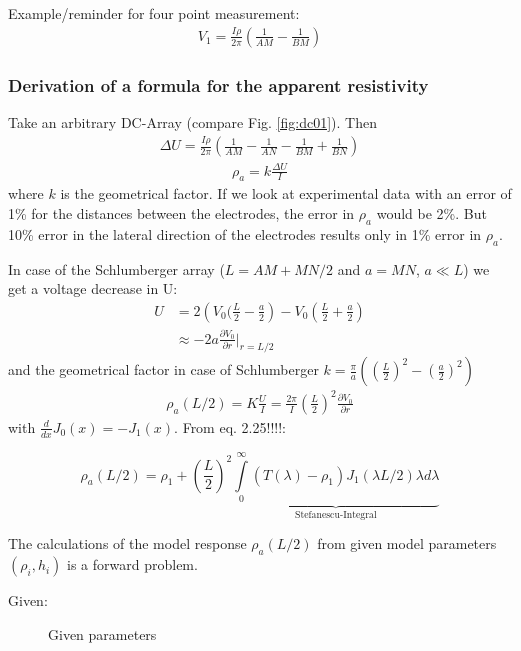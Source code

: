 Example/reminder for four point measurement:
\begin{align*}
V_1=\frac{I\rho}{2\pi}\left(\frac{1}{AM}-\frac{1}{BM}\right)
\end{align*}

\subsubsection{Derivation of a formula for the apparent resistivity}
Take an arbitrary DC-Array (compare Fig. \ref{fig:dc01}). Then
\begin{align*}
\Delta U=\frac{I\rho}{2\pi}\left(\frac{1}{AM}-\frac{1}{AN}-\frac{1}{BM}+\frac{1}{BN}\right)
\end{align*}
\begin{align*}
\rho_a=k\frac{\Delta U}{I}
\end{align*}
where $k$ is the geometrical factor.
If we look at experimental data with an error of 1\% for the distances between the electrodes, the error in $\rho_a$ would be 2\%. But 10\% error in the lateral direction of the electrodes results only in 1\% error in $\rho_a$.

In case of the Schlumberger array ($L=AM+MN/2$ and $a=MN$, $a\ll L$) we get a voltage decrease in U:
\begin{align*}
U&=2\left(V_0(\frac{L}{2}-\frac{a}{2}\right)-V_0\left(\frac{L}{2}+\frac{a}{2}\right)\\
&\approx -2a\frac{\partial V_0}{\partial r}\bigg|_{r=L/2}
\end{align*}
and the geometrical factor in case of Schlumberger $k=\frac{\pi}{a}\left(\left(\frac{L}{2}\right)^2-\left(\frac{a}{2}\right)^2\right)$
\begin{align*}
\rho_a(L/2)=K\frac{U}{I}=\frac{2\pi}{I}\left(\frac{L}{2}\right)^2\frac{\partial V_0}{\partial r}
\end{align*}
with $\frac{d}{dx}J_0(x)=-J_1(x)$. From eq. 2.25!!!!:

\begin{equation}
\rho_a(L/2)=\rho_1+\left(\frac{L}{2}\right)^2\underbrace{\int\limits_{0}^{\infty}(T(\lambda)-\rho_1)J_1(\lambda L/2)\lambda d\lambda}_{\textrm{Stefanescu-Integral}} \label{eq:rho_a_01}
\end{equation}

The calculations of the model response $\rho_a(L/2)$ from given model parameters $(\rho_i,h_i)$ is a forward problem. 

Given:
\begin{figure}[h!]
\begin{center}
\caption{Given parameters}
\label{fig:forwardgiven}
\end{center}
\end{figure}
